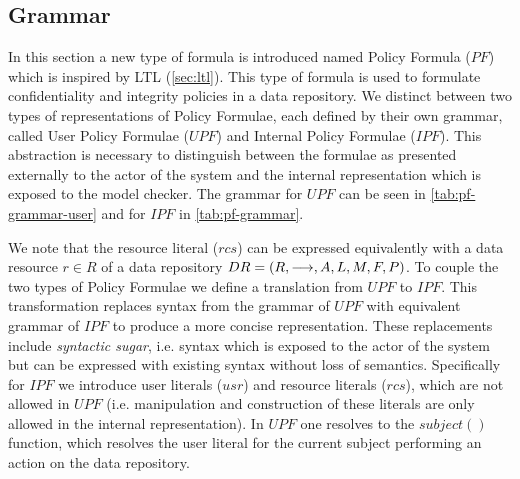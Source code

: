 \subsection{Grammar}\label{sec:grammar}
In this section a new type of formula is introduced named Policy Formula ($PF$) which is inspired by LTL (\autoref{sec:ltl}). This type of formula is used to formulate confidentiality and integrity policies in a data repository. We distinct between two types of representations of Policy Formulae, each defined by their own grammar, called User Policy Formulae ($UPF$) and Internal Policy Formulae ($IPF$). This abstraction is necessary to distinguish between the formulae as presented externally to the actor of the system and the internal representation which is exposed to the model checker. The grammar for $UPF$ can be seen in \autoref{tab:pf-grammar-user} and for $IPF$ in \autoref{tab:pf-grammar}.








We note that the resource literal ($rcs$) can be expressed equivalently with a data resource $r \in R$ of a data repository $DR= \left( R, \longrightarrow, A, L, M, F, P \right)$. To couple the two types of Policy Formulae we define a translation from $UPF$ to $IPF$. This transformation replaces syntax from the grammar of $UPF$ with equivalent grammar of $IPF$ to produce a more concise representation. These replacements include \emph{syntactic sugar}, i.e. syntax which is exposed to the actor of the system but can be expressed with existing syntax without loss of semantics. Specifically for $IPF$ we introduce user literals ($usr$) and resource literals ($rcs$), which are not allowed in $UPF$ (i.e. manipulation and construction of these literals are only allowed in the internal representation). In $UPF$ one resolves to the $subject()$ function, which resolves the user literal for the current subject performing an action on the data repository.

